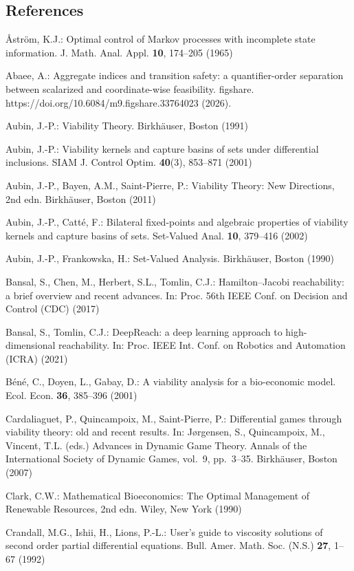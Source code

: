 \documentclass[10pt,twocolumn]{article}
\theoremstyle{definition}
\begin{document}
\subsection{References}\label{references}
{\footnotesize

\r{A}str\"om, K.J.: Optimal control of Markov processes with incomplete state information. J. Math. Anal. Appl. \textbf{10}, 174--205 (1965)

Abaee, A.: Aggregate indices and transition safety: a quantifier-order separation between scalarized and coordinate-wise feasibility. figshare. https://doi.org/10.6084/m9.figshare.33764023 (2026).

Aubin, J.-P.: Viability Theory. Birkh\"auser, Boston (1991)

Aubin, J.-P.: Viability kernels and capture basins of sets under differential inclusions. SIAM J. Control Optim. \textbf{40}(3), 853--871 (2001)

Aubin, J.-P., Bayen, A.M., Saint-Pierre, P.: Viability Theory: New Directions, 2nd edn. Birkh\"auser, Boston (2011)

Aubin, J.-P., Catt\'e, F.: Bilateral fixed-points and algebraic properties of viability kernels and capture basins of sets. Set-Valued Anal. \textbf{10}, 379--416 (2002)

Aubin, J.-P., Frankowska, H.: Set-Valued Analysis. Birkh\"auser, Boston (1990)

Bansal, S., Chen, M., Herbert, S.L., Tomlin, C.J.: Hamilton--Jacobi reachability: a brief overview and recent advances. In: Proc. 56th IEEE Conf. on Decision and Control (CDC) (2017)

Bansal, S., Tomlin, C.J.: DeepReach: a deep learning approach to high-dimensional reachability. In: Proc. IEEE Int. Conf. on Robotics and Automation (ICRA) (2021)

B\'en\'e, C., Doyen, L., Gabay, D.: A viability analysis for a bio-economic
model. Ecol. Econ. \textbf{36}, 385--396 (2001)

Cardaliaguet, P., Quincampoix, M., Saint-Pierre, P.: Differential games
through viability theory: old and recent results. In: J\o{}rgensen, S.,
Quincampoix, M., Vincent, T.L. (eds.) Advances in Dynamic Game Theory.
Annals of the International Society of Dynamic Games, vol.~9, pp.~3--35.
Birkh\"auser, Boston (2007)

Clark, C.W.: Mathematical Bioeconomics: The Optimal Management of Renewable Resources, 2nd edn. Wiley, New York (1990)

Crandall, M.G., Ishii, H., Lions, P.-L.: User's guide to viscosity solutions of second order partial differential equations. Bull. Amer. Math. Soc. (N.S.) \textbf{27}, 1--67 (1992)

}
\end{document}

